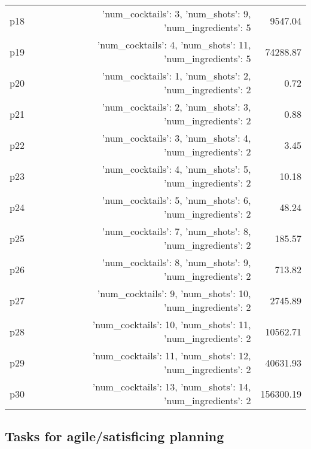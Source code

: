 \documentclass{article}
\begin{document}
\begin{center}
\begin{tabular}{@{}l|r|r@{}}
  p18&{'num\_cocktails': 3, 'num\_shots': 9, 'num\_ingredients': 5}&9547.04\\
  p19&{'num\_cocktails': 4, 'num\_shots': 11, 'num\_ingredients': 5}&74288.87\\
  p20&{'num\_cocktails': 1, 'num\_shots': 2, 'num\_ingredients': 2}&0.72\\
  p21&{'num\_cocktails': 2, 'num\_shots': 3, 'num\_ingredients': 2}&0.88\\
  p22&{'num\_cocktails': 3, 'num\_shots': 4, 'num\_ingredients': 2}&3.45\\
  p23&{'num\_cocktails': 4, 'num\_shots': 5, 'num\_ingredients': 2}&10.18\\
  p24&{'num\_cocktails': 5, 'num\_shots': 6, 'num\_ingredients': 2}&48.24\\
  p25&{'num\_cocktails': 7, 'num\_shots': 8, 'num\_ingredients': 2}&185.57\\
  p26&{'num\_cocktails': 8, 'num\_shots': 9, 'num\_ingredients': 2}&713.82\\
  p27&{'num\_cocktails': 9, 'num\_shots': 10, 'num\_ingredients': 2}&2745.89\\
  p28&{'num\_cocktails': 10, 'num\_shots': 11, 'num\_ingredients': 2}&10562.71\\
  p29&{'num\_cocktails': 11, 'num\_shots': 12, 'num\_ingredients': 2}&40631.93\\
  p30&{'num\_cocktails': 13, 'num\_shots': 14, 'num\_ingredients': 2}&156300.19
                            \end{tabular}
                            \end{center}
                    

                                \subsection*{Tasks for agile/satisficing planning}
                                
\end{document}
